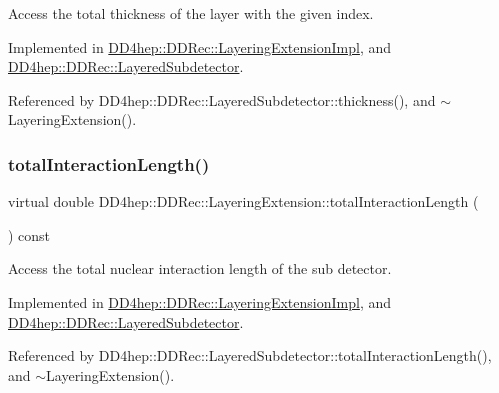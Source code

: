 Access the total thickness of the layer with the given index. 



Implemented in \hyperlink{class_d_d4hep_1_1_d_d_rec_1_1_layering_extension_impl_a2bea36deda3a0b6962f4c24243749705}{D\+D4hep\+::\+D\+D\+Rec\+::\+Layering\+Extension\+Impl}, and \hyperlink{class_d_d4hep_1_1_d_d_rec_1_1_layered_subdetector_ad9137940a82be255808d475379d292b6}{D\+D4hep\+::\+D\+D\+Rec\+::\+Layered\+Subdetector}.



Referenced by D\+D4hep\+::\+D\+D\+Rec\+::\+Layered\+Subdetector\+::thickness(), and $\sim$\+Layering\+Extension().

\hypertarget{class_d_d4hep_1_1_d_d_rec_1_1_layering_extension_aa5440bf9dc11305a785765ca155437fa}{}\label{class_d_d4hep_1_1_d_d_rec_1_1_layering_extension_aa5440bf9dc11305a785765ca155437fa} 
\subsubsection{\texorpdfstring{total\+Interaction\+Length()}{totalInteractionLength()}}
{\footnotesize\ttfamily virtual double D\+D4hep\+::\+D\+D\+Rec\+::\+Layering\+Extension\+::total\+Interaction\+Length (\begin{DoxyParamCaption}{ }\end{DoxyParamCaption}) const\hspace{0.3cm}{\ttfamily [pure virtual]}}



Access the total nuclear interaction length of the sub detector. 



Implemented in \hyperlink{class_d_d4hep_1_1_d_d_rec_1_1_layering_extension_impl_ad90a8ec4d00d9aff220e9091d822a009}{D\+D4hep\+::\+D\+D\+Rec\+::\+Layering\+Extension\+Impl}, and \hyperlink{class_d_d4hep_1_1_d_d_rec_1_1_layered_subdetector_a5b22049dfabd7fa556ba0c18e78daa3a}{D\+D4hep\+::\+D\+D\+Rec\+::\+Layered\+Subdetector}.



Referenced by D\+D4hep\+::\+D\+D\+Rec\+::\+Layered\+Subdetector\+::total\+Interaction\+Length(), and $\sim$\+Layering\+Extension().

